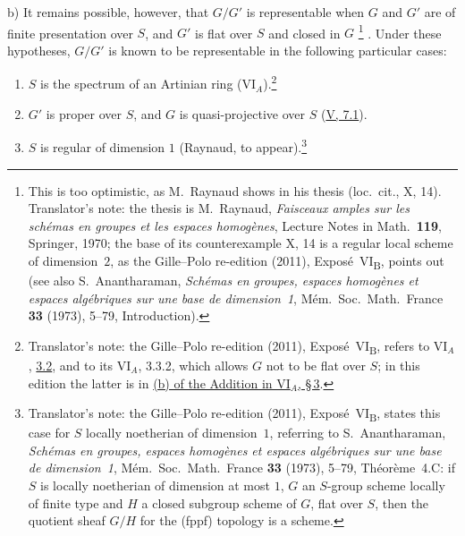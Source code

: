 \label{rem:sga3-VIB-9.3-b}%
\textup{b)} It remains possible, however, that \(G/G'\) is
representable when \(G\) and \(G'\) are of finite presentation
over \(S\), and \(G'\) is flat over \(S\) and closed in \(G\)%
\begingroup
\renewcommand{\thefootnote}{\fnsymbol{footnote}}%
\footnote[1]{\label{note:sga3-VIB-9.3-star}This is too
optimistic, as M.\ Raynaud shows in his thesis
\textup{(loc.\ cit., X, 14)}. Translator's note: the thesis is M.~Raynaud,
\emph{Faisceaux amples sur les sch\'emas en groupes et les espaces homog\`enes}, Lecture Notes in Math.\
\textbf{119}, Springer, 1970; the base of its counterexample X, 14 is a regular local scheme of
dimension~\(2\), as the Gille--Polo re-edition (2011), Expos\'e~VI\textsubscript{B}, points out (see also
S.~Anantharaman, \emph{Sch\'emas en groupes, espaces homog\`enes et espaces alg\'ebriques sur une base de
dimension~1}, M\'em.\ Soc.\ Math.\ France \textbf{33} (1973), 5--79, Introduction).}%
\endgroup\hspace{0.15em}%
.
Under these hypotheses, \(G/G'\) is known to be representable
in the following particular cases:
\begin{enumerate}
\item[\textup{\(1^\circ\)---}]\label{case:sga3-VIB-9.3-b-1}
  \(S\) is the spectrum of an Artinian ring
  (VI\(_A\)).\footnote{Translator's note: the Gille--Polo re-edition (2011),
  Expos\'e~VI\textsubscript{B}, refers to VI\(_A\), \hyperref[thm:sga3-VIA-3.2]{3.2}, and to its VI\(_A\),
  3.3.2, which allows \(G\) not to be flat over \(S\); in this edition the latter is in
  \hyperref[thm:sga3-VIA-3.3.2]{(b) of the Addition in VI\(_A\), \S\,3}.}

\item[\textup{\(2^\circ\)---}]\label{case:sga3-VIB-9.3-b-2}
  \(G'\) is proper over \(S\), and \(G\) is quasi-projective
  over \(S\) (\hyperref[thm:sga3-V-7.1]{V, 7.1}).

\item[\textup{\(3^\circ\)---}]\label{case:sga3-VIB-9.3-b-3}
  \(S\) is regular of dimension \(1\) (Raynaud, to appear).\footnote{Translator's note: the
  Gille--Polo re-edition (2011), Expos\'e~VI\textsubscript{B}, states this case for \(S\) locally noetherian
  of dimension~\(1\), referring to S.~Anantharaman, \emph{Sch\'emas en groupes, espaces homog\`enes et espaces
  alg\'ebriques sur une base de dimension~1}, M\'em.\ Soc.\ Math.\ France \textbf{33} (1973), 5--79,
  Th\'eor\`eme~4.C: if \(S\) is locally noetherian of dimension at most \(1\), \(G\) an \(S\)-group scheme
  locally of finite type and \(H\) a closed subgroup scheme of \(G\), flat over \(S\), then the quotient
  sheaf \(G/H\) for the \textup{(fppf)} topology is a scheme.}
\end{enumerate}

